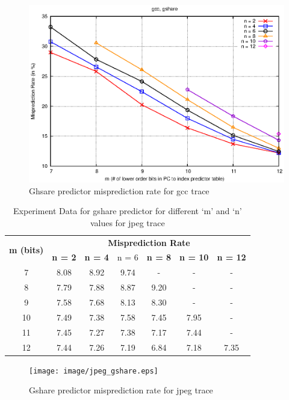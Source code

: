 \begin{figure} [htbp]
    \centering
    \includegraphics[scale=1.32] {image/gcc_gshare.eps}
    \caption{Ghsare predictor misprediction rate for gcc trace}
    \label{fig:gshare_gcc}
\end{figure}

\begin{table}[htbp]
    \centering
    \begin{tabular}{|c|c|c|c|c|c|c|}
        \hline
        \multirow{2}[6]{*}{\bf m (bits) } & \multicolumn{6}{c|}{\bf Misprediction Rate} \\
        \cline{2-7} & \bf n = 2 & \bf n = 4 & n = 6 & \bf n = 8 & \bf n = 10 & \bf n = 12 \\
        \hline
         7 & 8.08 & 8.92 & 9.74 & - & - & - \\
         8 & 7.79 & 7.88 & 8.87 & 9.20 & - & - \\
         9 & 7.58 & 7.68 & 8.13 & 8.30 & - & - \\
        10 & 7.49 & 7.38 & 7.58 & 7.45 & 7.95 & - \\
        11 & 7.45 & 7.27 & 7.38 & 7.17 & 7.44 & - \\
        12 & 7.44 & 7.26 & 7.19 & 6.84 & 7.18 & 7.35 \\
        \hline
    \end{tabular}
    \captionsetup{justification=centering}
    \caption{Experiment Data for gshare predictor for different `m' and `n' values for jpeg trace}
    \label{tab:gshare_jpeg}
\end{table}

\begin{figure} [htbp]
    \centering
    \texttt{[image: image/jpeg\_gshare.eps]}
    \caption{Gshare predictor misprediction rate for jpeg trace}
    \label{fig:gshare_jpeg}
\end{figure}

